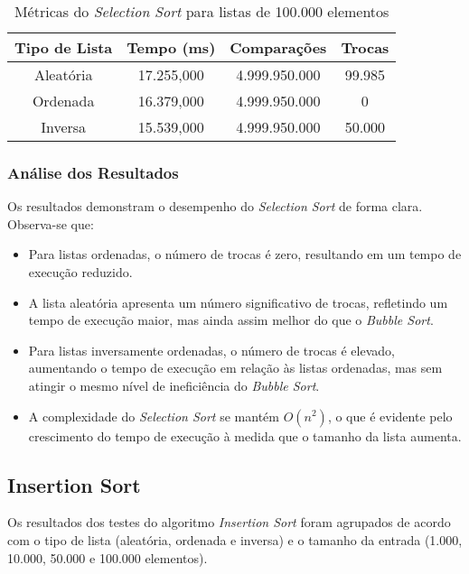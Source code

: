 \documentclass[a4paper,12pt]{article}
\begin{document}
\begin{table}[H]
\centering
\caption{Métricas do \textit{Selection Sort} para listas de 100.000 elementos}
\begin{tabular}{|c|c|c|c|}
\hline
\textbf{Tipo de Lista} & \textbf{Tempo (ms)} & \textbf{Comparações} & \textbf{Trocas} \\ \hline
Aleatória              & 17.255,000          & 4.999.950.000        & 99.985          \\ \hline
Ordenada               & 16.379,000          & 4.999.950.000        & 0               \\ \hline
Inversa                & 15.539,000          & 4.999.950.000        & 50.000          \\ \hline
\end{tabular}
\end{table}

\subsubsection{Análise dos Resultados}

Os resultados demonstram o desempenho do \textit{Selection Sort} de forma clara. Observa-se que:

\begin{itemize}
    \item Para listas ordenadas, o número de trocas é zero, resultando em um tempo de execução reduzido.
    \item A lista aleatória apresenta um número significativo de trocas, refletindo um tempo de execução maior, mas ainda assim melhor do que o \textit{Bubble Sort}.
    \item Para listas inversamente ordenadas, o número de trocas é elevado, aumentando o tempo de execução em relação às listas ordenadas, mas sem atingir o mesmo nível de ineficiência do \textit{Bubble Sort}.
    \item A complexidade do \textit{Selection Sort} se mantém $O(n^2)$, o que é evidente pelo crescimento do tempo de execução à medida que o tamanho da lista aumenta.
\end{itemize}




\subsection{Insertion Sort}

Os resultados dos testes do algoritmo \textit{Insertion Sort} foram agrupados de acordo com o tipo de lista (aleatória, ordenada e inversa) e o tamanho da entrada (1.000, 10.000, 50.000 e 100.000 elementos).
\end{document}
